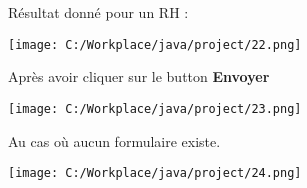 \documentclass[12]{article}
\begin{document}
Résultat donné pour un RH :

\begin{center}
\texttt{[image: C:/Workplace/java/project/22.png]}
\end{center}

Après avoir cliquer sur le button \textbf{Envoyer}

\begin{center}
\texttt{[image: C:/Workplace/java/project/23.png]}
\end{center}

Au cas où aucun formulaire existe.

\begin{center}
\texttt{[image: C:/Workplace/java/project/24.png]}
\end{center}
\end{document}
